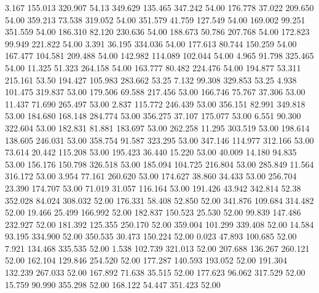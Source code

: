    3.167  155.013  320.907        54.13
 349.629  135.465  347.242        54.00
 176.778   37.022  209.650        54.00
 359.213   73.538  319.052        54.00
 351.579   41.759  127.549        54.00
 169.002   99.251  351.559        54.00
 186.310   82.120  230.636        54.00
 188.673   50.786  207.768        54.00
 172.823   99.949  221.822        54.00
   3.391   36.195  334.036        54.00
 177.613   80.744  150.259        54.00
 167.477  104.581  209.488        54.00
 142.982  114.089  102.044        54.00
   4.965   91.798  325.465        54.00
  11.325   51.323  264.158        54.00
 163.777   80.482  224.476        54.00
 194.877   53.311  215.161        53.50
 194.427  105.983  283.662        53.25
   7.132   99.308  329.853        53.25
   4.938  101.475  319.837        53.00
 179.506   69.588  217.456        53.00
 166.746   75.767   37.306        53.00
  11.437   71.690  265.497        53.00
   2.837  115.772  246.439        53.00
 356.151   82.991  349.818        53.00
 184.680  168.148  284.774        53.00
 356.275   37.107  175.077        53.00
   6.551   90.300  322.604        53.00
 182.831   81.881  183.697        53.00
 262.258   11.295  303.519        53.00
 198.614  138.605  246.031        53.00
 358.754   91.587  323.295        53.00
 347.146  114.977  312.166        53.00
  73.614   20.442  115.208        53.00
 195.423   36.440   15.220        53.00
  40.009   14.180   94.835        53.00
 156.176  150.798  326.518        53.00
 185.094  104.725  216.804        53.00
 285.849   11.564  316.172        53.00
   3.954   77.161  260.620        53.00
 174.627   38.860   34.433        53.00
 256.704   23.390  174.707        53.00
  71.019   31.057  116.164        53.00
 191.426   43.942  342.814        52.38
 352.028   84.024  308.032        52.00
 176.331   58.408   52.850        52.00
 341.876  109.684  314.482        52.00
  19.466   25.499  166.992        52.00
 182.837  150.523   25.530        52.00
  99.839  147.486  232.927        52.00
 181.392  125.355  250.170        52.00
 359.004  101.299  339.408        52.00
  14.584   93.195  334.900        52.00
 350.535   30.473  150.224        52.00
   0.023   47.893  100.685        52.00
   7.921  134.468  335.535        52.00
   1.538  102.739  321.013        52.00
 207.688  136.267  260.121        52.00
 162.104  129.846  254.520        52.00
 177.287  140.593  193.052        52.00
 191.304  132.239  267.033        52.00
 167.892   71.638   35.515        52.00
 177.623   96.062  317.529        52.00
  15.759   90.990  355.298        52.00
 168.122   54.447  351.423        52.00
